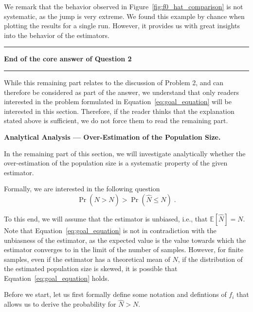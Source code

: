 We remark that the behavior observed in Figure~\ref{fig:f0_hat_comparison} is not systematic, as the jump is very extreme. We found this example by chance when plotting the results for a single run. However, it provides us with great insights into the behavior of the estimators.

\begin{center}
    \noindent\rule{0.2\linewidth}{0.4pt}
    \hspace{0.02\linewidth}
    \textbf{End of the core answer of Question 2}
    \hspace{0.02\linewidth}
    \rule{0.2\linewidth}{0.4pt}
\end{center}

While this remaining part relates to the discussion of Problem 2, and can therefore be considered as part of the answer, we understand that only readers interested in the problem formulated in Equation~\ref{eq:goal_equation} will be interested in this section. 
Therefore, if the reader thinks that the explanation stated above is sufficient, we do not force them to read the remaining part.

\textbf{Analytical Analysis --- Over-Estimation of the Population Size.}

In the remaining part of this section, we will investigate analytically whether the over-estimation of the population size is a systematic property of the given estimator.


Formally, we are interested in the following question
\begin{equation}
    \Pr(\hat{N} > N) > \Pr(\hat{N} \leq N)\;.
    \label{eq:goal_equation}
\end{equation}

To this end, we will assume that the estimator is unbiased, i.e., that $\mathbb{E}[\hat{N}] = N$. 
Note that Equation~\ref{eq:goal_equation} is not in contradiction with the unbiasness of the estimator, as the expected value is the value towards which the estimator converges to in the limit of the number of samples. However, for finite samples, even if the estimator has a theoretical mean of $N$, if the distribution of the estimated population size is skewed, it is possible that Equation~\ref{eq:goal_equation} holds. 


Before we start, let us first formally define some notation and defintions of $f_i$ that allows us to derive the probability for $\hat{N} > N$.

